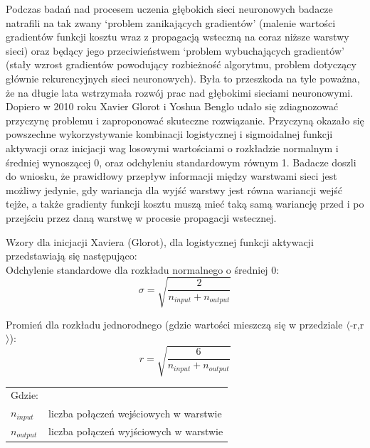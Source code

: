 \documentclass[a4paper,11pt]{article}
\begin{document}
    Podczas badań nad procesem uczenia głębokich sieci neuronowych badacze natrafili na tak zwany `problem zanikających gradientów' (malenie wartości gradientów funkcji kosztu wraz z propagacją wsteczną na coraz niższe warstwy sieci) oraz będący jego przeciwieństwem `problem wybuchających gradientów' (stały wzrost gradientów powodujący rozbieżność algorytmu, problem dotyczący głównie rekurencyjnych sieci neuronowych)\cite{UczenieMaszynowe2018}. Była to przeszkoda na tyle poważna, że na długie lata wstrzymała rozwój prac nad głębokimi sieciami neuronowymi. Dopiero w 2010 roku Xavier Glorot i Yoshua Benglo udało się zdiagnozować przyczynę problemu i zaproponować skuteczne rozwiązanie. Przyczyną okazało się powszechne wykorzystywanie kombinacji logistycznej i sigmoidalnej funkcji aktywacji oraz inicjacji wag losowymi wartościami o rozkładzie normalnym i średniej wynoszącej 0, oraz odchyleniu standardowym równym 1. Badacze doszli do wniosku, że prawidłowy przepływ informacji między warstwami sieci jest możliwy jedynie, gdy wariancja dla wyjść warstwy jest równa wariancji wejść tejże, a także gradienty funkcji kosztu muszą mieć taką samą wariancję przed i po przejściu przez daną warstwę w procesie propagacji wstecznej\cite{UnderstandingTheDifficultyOfTrainingDeepFeedforwardNeuralNetworks2010}.

    \bigskip

    \noindent
    \begin{minipage}[H]{\textwidth}
        \setlength\parindent{17pt} Wzory dla inicjacji Xaviera (Glorot), dla logistycznej funkcji aktywacji przedstawiają się następująco: \\
        \bigskip
        \setlength\parindent{17pt} Odchylenie standardowe dla rozkładu normalnego o średniej 0: \\
        \begin{equation}
            \label{eq:std_dev_xavier}
            \sigma = \sqrt{\frac{2}{n_{input} + n_{output}}}
        \end{equation}
    \end{minipage}

    \smallskip

    \noindent
    \begin{minipage}[H]{\textwidth}
        \setlength\parindent{17pt} Promień dla rozkładu jednorodnego (gdzie wartości mieszczą się w przedziale $\langle$-r,r$\rangle$): \\
        \begin{equation}
            \label{eq:radius_xavier}
            r = \sqrt{\frac{6}{n_{input} + n_{output}}}
        \end{equation}
        \smallskip
        \begin{tabular}{p{}p{}}
            Gdzie: \\
            $n_{input}$  & liczba połączeń wejściowych w warstwie \\
            $n_{output}$ & liczba połączeń wyjściowych w warstwie \\
        \end{tabular}
    \end{minipage}
\end{document}
